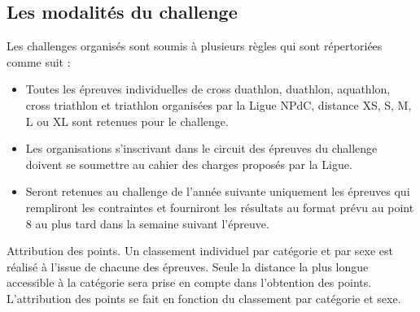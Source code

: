 	
	\subsection{Les modalités du challenge  }
	Les challenges organisés sont soumis à plusieurs règles qui sont répertoriées comme suit :
	\begin{itemize} 
	\item 	Toutes les épreuves individuelles de cross duathlon, duathlon, aquathlon, cross triathlon et triathlon organisées par la Ligue NPdC, distance XS, S, M, L ou XL sont retenues pour le challenge.
	\item 	Les organisations s'inscrivant dans le circuit des épreuves du challenge doivent se soumettre au cahier des charges proposés par la Ligue.
	 \item  Seront retenues au challenge de l’année suivante uniquement les épreuves qui rempliront les contraintes et fourniront les résultats au format prévu au point 8 au plus tard dans la semaine suivant l’épreuve.
	
	\end{itemize} 
\newpage
	 Attribution des points. Un classement individuel par catégorie et par sexe est réalisé à l’issue de chacune des épreuves. Seule la distance la plus longue accessible à la catégorie sera prise en compte dans l’obtention des points.\\
	L’attribution des points se fait en fonction du classement par catégorie et sexe. 
	
